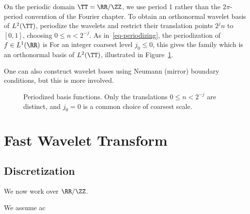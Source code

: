 On the periodic domain $\TT=\RR/\ZZ$, we use period 1 rather than the $2\pi$-period convention of the Fourier chapter. To obtain an orthonormal wavelet basis of $L^2(\TT)$, periodize the wavelets and restrict their translation points $2^j n$ to $[0,1]$, choosing $0 \leq n < 2^{-j}$. As in~\eqref{eq-periodizing}, the periodization of $f \in L^1(\RR)$ is
For an integer coarsest level $j_0\leq0$, this gives the family
which is an orthonormal basis of $L^2(\TT)$, illustrated in Figure~\ref{fig-periodize}.
 
One can also construct wavelet bases using Neumann (mirror) boundary conditions, but this is more involved.



\begin{figure}[tbp]
\centering
{}\hfill
{}
\caption{Periodized basis functions. Only the translations $0\leq n<2^{-j}$ are distinct, and $j_0=0$ is a common choice of coarsest scale.}
\label{fig-periodize}
\end{figure}



                                                   
\section{Fast Wavelet Transform}\label{sec-fast-wavelet-transform}

   
\subsection{Discretization}

We now work over $\RR/\ZZ$.
 
We assume ac